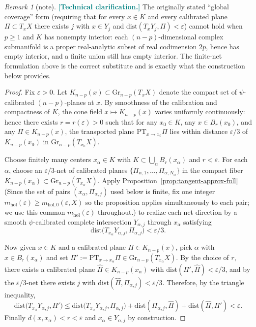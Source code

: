 \documentclass[11pt]{article}
\newcommand{\REVMZ}[1]{\textcolor{teal}{#1}}  %
\numberwithin{equation}{section}  %
\theoremstyle{plain}
\theoremstyle{definition}
\theoremstyle{remark}
\newtheorem{remark}[theorem]{Remark}
\newcommand{\mhol}{m_{\mathrm{hol}}} %
\newcommand{\Gr}{\mathrm{Gr}}
\newcommand{\dist}{\mathrm{dist}}
\begin{document}
\begin{remark}[note]
\REVMZ{\textbf{[Technical clarification.]}}
{%
The originally stated ``global coverage'' form (requiring that for every $x\in K$ and every calibrated plane
$\Pi\subset T_xX$ there exists $j$ with \emph{$x\in Y_j$} and $\dist(T_xY_j,\Pi)<\varepsilon$)
cannot hold when $p\ge 1$ and $K$ has nonempty interior: each $(n-p)$-dimensional complex submanifold is a proper
real-analytic subset of real codimension $2p$, hence has empty interior, and a finite union still has empty interior.
The finite-net formulation above is the correct substitute and is exactly what the construction below provides.
}%
\end{remark}

\begin{proof}
{%
Fix $\varepsilon>0$.
Let $K_{n-p}(x)\subset \Gr_{n-p}(T_xX)$ denote the compact set of $\psi$-calibrated $(n-p)$-planes at $x$.
By smoothness of the calibration and compactness of $K$, the cone field $x\mapsto K_{n-p}(x)$ varies uniformly
continuously: hence there exists $r=r(\varepsilon)>0$ such that for any $x_0\in K$, any $x\in B_r(x_0)$, and any
$\Pi\in K_{n-p}(x)$, the transported plane $\mathrm{PT}_{x\to x_0}\Pi$ lies within distance $\varepsilon/3$ of
$K_{n-p}(x_0)$ in $\Gr_{n-p}(T_{x_0}X)$.

Choose finitely many centers $x_\alpha\in K$ with $K\subset\bigcup_\alpha B_r(x_\alpha)$ and $r<\varepsilon$.
For each $\alpha$, choose an $\varepsilon/3$-net of calibrated planes
$\{\Pi_{\alpha,1},\ldots,\Pi_{\alpha,N_\alpha}\}$ in the compact fiber $K_{n-p}(x_\alpha)\subset\Gr_{n-p}(T_{x_\alpha}X)$.
Apply Proposition~\ref{prop:tangent-approx-full}{ (Since the set of pairs $(x_\alpha,\Pi_{\alpha,j})$ used below is finite, fix one integer $\mhol(\varepsilon)\ge m_{\mathrm{hol},0}(\varepsilon,X)$ so the proposition applies simultaneously to each pair; we use this common $\mhol(\varepsilon)$ throughout.)} to realize each net direction by a smooth $\psi$-calibrated complete
intersection $Y_{\alpha,j}$ through $x_\alpha$ satisfying
\[
\dist\!\bigl(T_{x_\alpha}Y_{\alpha,j},\Pi_{\alpha,j}\bigr)<\varepsilon/3.
\]

Now given $x\in K$ and a calibrated plane $\Pi\in K_{n-p}(x)$, pick $\alpha$ with $x\in B_r(x_\alpha)$ and set
$\Pi':=\mathrm{PT}_{x\to x_\alpha}\Pi\in\Gr_{n-p}(T_{x_\alpha}X)$.
By the choice of $r$, there exists a calibrated plane $\widehat\Pi\in K_{n-p}(x_\alpha)$ with
$\dist(\Pi',\widehat\Pi)<\varepsilon/3$, and by the $\varepsilon/3$-net there exists $j$ with
$\dist(\widehat\Pi,\Pi_{\alpha,j})<\varepsilon/3$.
Therefore, by the triangle inequality,
\[
\dist\!\bigl(T_{x_\alpha}Y_{\alpha,j},\Pi'\bigr)
\le \dist\!\bigl(T_{x_\alpha}Y_{\alpha,j},\Pi_{\alpha,j}\bigr)
   +\dist(\Pi_{\alpha,j},\widehat\Pi)+\dist(\widehat\Pi,\Pi')
<\varepsilon.
\]
Finally $d(x,x_\alpha)<r<\varepsilon$ and $x_\alpha\in Y_{\alpha,j}$ by construction.
}%
\end{proof}
\end{document}
